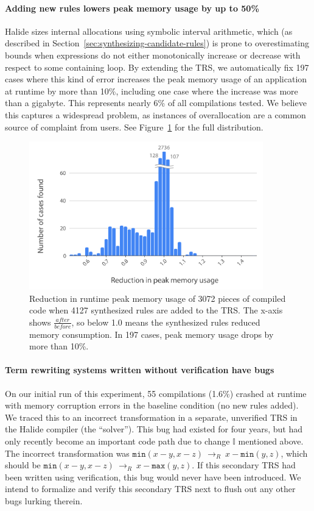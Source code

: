 \documentclass[acmsmall,review]{acmart}\settopmatter{printfolios=true,printccs=false,printacmref=false}
\newcommand{\hmax}[0]{\texttt{max}}
\newcommand{\hmin}[0]{\texttt{min}}
\newcommand{\rewrites}[0]{\:\rightarrow_{R}\:}
\begin{document}
\paragraph{Adding new rules lowers peak memory usage by up to 50\%}
Halide sizes internal allocations using symbolic interval arithmetic,
which (as described in Section~\ref{sec:synthesizing-candidate-rules})
is prone to overestimating bounds when
expressions do not either monotonically increase or decrease with
respect to some containing loop. By extending the TRS, we
automatically fix 197 cases where this kind of error increases the
peak memory usage of an application at runtime by more than 10\%, including one
case where the increase was more than a gigabyte. This represents
nearly 6\% of all compilations tested. We believe this captures a
widespread problem, as instances of overallocation are a common source
of complaint from users. See Figure~\ref{fig:peakmemoryhistogram} for
the full distribution. 

\begin{figure}
  \includegraphics[width=4in]{figures/memoryhistogram.pdf}
\caption{Reduction in runtime peak memory usage of 3072 pieces of compiled
  code when 4127 synthesized rules are added to the TRS. The x-axis
  shows $\frac{after}{before}$, so below 1.0 means the synthesized rules
  reduced memory consumption.  In 197 cases,
  peak memory usage drops by more than 10\%.}
\label{fig:peakmemoryhistogram}
\end{figure}

\paragraph{Term rewriting systems written without verification have bugs}
On our initial run of this experiment, 55 compilations (1.6\%) crashed
at runtime with memory corruption errors in the baseline condition (no
new rules added). We traced this to an incorrect transformation in a
separate, unverified TRS in the Halide compiler (the ``solver''). This
bug had existed for four years, but had only recently become an
important code path due to change $\mathbb{I}$ mentioned above. The
incorrect transformation was $\hmin(x - y, x - z) \rewrites x - \hmin(y, z)$,
which should be $\hmin(x - y, x - z) \rewrites x - \hmax(y, z)$. If this
secondary TRS had been written using verification, this bug would
never have been introduced. We intend to formalize and verify this
secondary TRS next to flush out any other bugs lurking therein.
\end{document}
